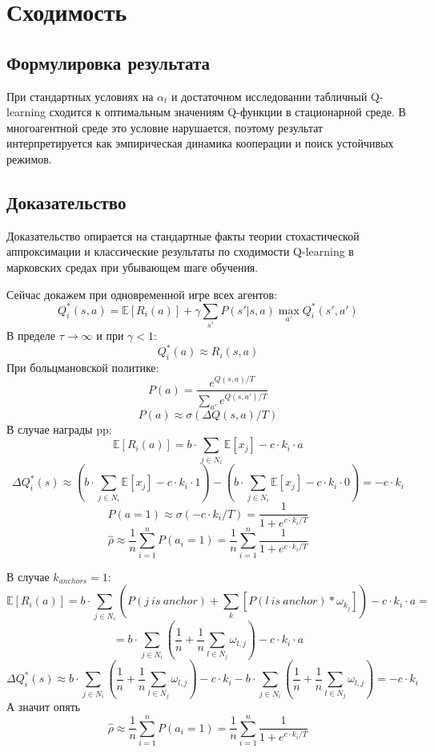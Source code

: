 \documentclass[a4paper, fontsize=14pt]{article}
\begin{document}
\section{Сходимость}
\subsection{Формулировка результата}
При стандартных условиях на $\alpha_t$ и достаточном исследовании
табличный Q-learning сходится к оптимальным значениям Q-функции
в стационарной среде. В многоагентной среде это условие нарушается,
поэтому результат интерпретируется как эмпирическая динамика
кооперации и поиск устойчивых режимов.

\subsection{Доказательство}
Доказательство опирается на стандартные факты теории стохастической
аппроксимации и классические результаты по сходимости Q-learning
в марковских средах при убывающем шаге обучения.

Сейчас докажем при одновременной игре всех агентов:
$$ Q_i^*(s, a) = \mathbb{E}[R_i(a)] + \gamma \sum_{s'} P(s'|s,a) \max_{a'} Q_i^*(s', a') $$
В пределе $\tau \to \infty$ и при $\gamma < 1$:
$$ Q_i^*(a) \approx R_i(s,a) $$
При больцмановской политике:
$$ P(a) = \frac{e^{Q(s,a)/T}}{\sum_{a'} e^{Q(s,a')/T}} $$
$$ P(a) \approx \sigma(\Delta Q(s,a)/T) $$
В случае награды pp:
$$ \mathbb{E}[R_i(a)] = b \cdot \sum_{j \in N_i} \mathbb{E}[x_j] - c \cdot k_i \cdot a $$
$$ \Delta Q_i^*(s) \approx (b \cdot \sum_{j \in N_i} \mathbb{E}[x_j] - c \cdot k_i \cdot 1) - (b \cdot \sum_{j \in N_i} \mathbb{E}[x_j] - c \cdot k_i \cdot 0) = - c \cdot k_i $$
$$ P(a=1) \approx \sigma(-c \cdot k_i / T) = \frac{1}{1 + e^{c \cdot k_i / T}} $$
$$ \hat{\rho} \approx \frac{1}{n} \sum_{i=1}^n P(a_i=1) = \frac{1}{n} \sum_{i=1}^n \frac{1}{1 + e^{c \cdot k_i / T}} $$

В случае $k_{anchors} = 1$:
$$ \mathbb{E}[R_i(a)] = b \cdot \sum_{j \in N_i} (P(j \ is \ anchor) + \sum_{k} [P(l \ is \ anchor) * \omega_{k_j}]) - c \cdot k_i \cdot a  = $$
$$ = b \cdot \sum_{j \in N_i} \left(\frac{1}{n} + \frac{1}{n} \sum_{l \in N_j} \omega_{l,j}\right) - c \cdot k_i \cdot a $$
$$ \Delta Q_i^*(s) \approx b \cdot \sum_{j \in N_i} \left(\frac{1}{n} + \frac{1}{n} \sum_{l \in N_j} \omega_{l,j}\right) - c \cdot k_i -b \cdot \sum_{j \in N_i} \left(\frac{1}{n} + \frac{1}{n} \sum_{l \in N_j} \omega_{l,j}\right) = - c \cdot k_i$$
А значит опять $$ \hat{\rho} \approx \frac{1}{n} \sum_{i=1}^n P(a_i=1) = \frac{1}{n} \sum_{i=1}^n \frac{1}{1 + e^{c \cdot k_i / T}} $$
\end{document}
